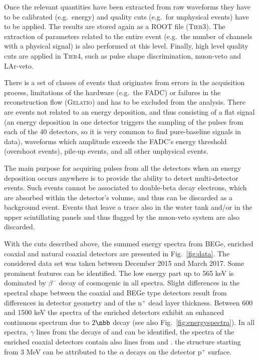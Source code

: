 Once the relevant quantities have been extracted from raw waveforms they have to be calibrated (e.g.~energy) and quality cuts (e.g.~for unphysical events) have to be applied. The results are stored again as a ROOT file (\textsc{Tier3}). The extraction of parameters related to the entire event (e.g.~the number of channels with a physical signal) is also performed at this level. Finally, high level quality cuts are applied in \textsc{Tier4}, such as pulse shape discrimination, muon-veto and LAr-veto.

 There is a set of classes of events that originates from errors in the acquisition process, limitations of the hardware (e.g.~the FADC) or failures in the reconstruction flow (\textsc{Gelatio}) and has to be excluded from the analysis. There are events not related to an energy deposition, and thus consisting of a flat signal (an energy deposition in one detector triggers the sampling of the pulses from each of the 40 detectors, so it is very common to find pure-baseline signals in data), waveforms which amplitude exceeds the FADC's energy threshold (overshoot events), pile-up events, and all other unphysical events.

The main purpose for acquiring pulses from all the detectors when an energy deposition occurs anywhere is to provide the ability to detect multi-detector events. Such events cannot be associated to double-beta decay electrons, which are absorbed within the detector's volume, and thus can be discarded as a background event. Events that leave a trace also in the water tank and/or in the upper scintillating panels and thus flagged by the muon-veto system are also discarded.

 With the cuts described above, the summed energy spectra from BEGe, enriched coaxial and natural coaxial detectors are presented in Fig.~\ref{fig:data}. The considered data set was taken between December 2015 and March 2017. Some prominent features can be identified. The low energy part up to 565 keV is dominated by $\beta^-$ decay of cosmogenic  in all spectra. Slight differences in the spectral shape between the coaxial and BEGe type detectors result from differences in detector geometry and of the n$^+$ dead layer thickness. Between 600 and 1500 keV the spectra of the enriched detectors exhibit an enhanced continuous spectrum due to $2\nbb$ decay (see also Fig.~\ref{fig:energyspectra}). In all spectra, $\gamma$ lines from the decays of  and  can be identified, the spectra of the enriched coaxial detectors contain also lines from  and . the structure starting from 3 MeV can be attributed to the $\alpha$ decays on the detector p$^+$ surface.

